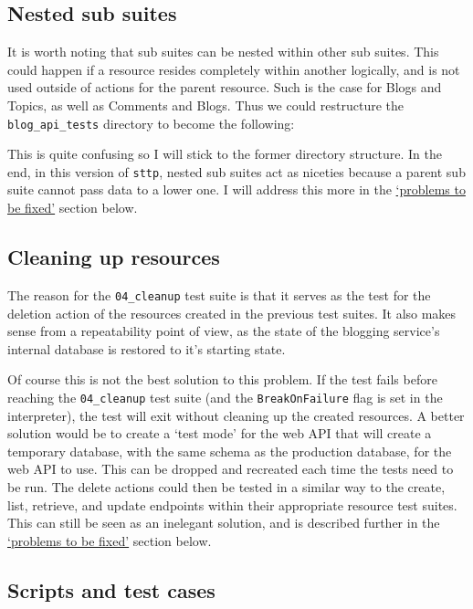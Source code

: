 \subsection{Nested sub suites}

It is worth noting that sub suites can be nested within other sub suites. This could happen if a resource resides completely within another logically, and is not used outside of actions for the parent resource. Such is the case for Blogs and Topics, as well as Comments and Blogs. Thus we could restructure the \verb|blog_api_tests| directory to become the following:

This is quite confusing so I will stick to the former directory structure. In the end, in this version of \verb|sttp|, nested sub suites act as niceties because a parent sub suite cannot pass data to a lower one. I will address this more in the \hyperref[sec:hello-sttp-problems-to-be-fixed]{`problems to be fixed'} section below.

\subsection{Cleaning up resources}

The reason for the \verb|04_cleanup| test suite is that it serves as the test for the deletion action of the resources created in the previous test suites. It also makes sense from a repeatability point of view, as the state of the blogging service's internal database is restored to it's starting state.

Of course this is not the best solution to this problem. If the test fails before reaching the \verb|04_cleanup| test suite (and the \verb|BreakOnFailure| flag is set in the interpreter), the test will exit without cleaning up the created resources. A better solution would be to create a `test mode' for the web API that will create a temporary database, with the same schema as the production database, for the web API to use. This can be dropped and recreated each time the tests need to be run. The delete actions could then be tested in a similar way to the create, list, retrieve, and update endpoints within their appropriate resource test suites. This can still be seen as an inelegant solution, and is described further in the \hyperref[sec:hello-sttp-problems-to-be-fixed]{`problems to be fixed'} section below.

\subsection{Scripts and test cases}

